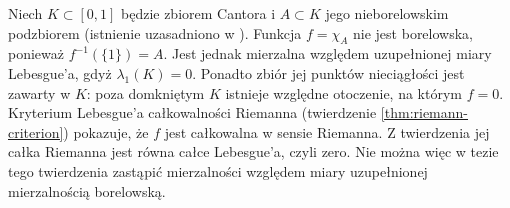\begin{przyklad}
\label{it:ex:riemann-nonborel}
Niech $K\subset[0,1]$ będzie zbiorem Cantora i
$A\subset K$ jego nieborelowskim podzbiorem
(istnienie uzasadniono w
).
Funkcja $f=\chi_A$ nie jest borelowska, ponieważ
$f^{-1}(\{1\})=A$. Jest jednak mierzalna względem
uzupełnionej miary Lebesgue'a, gdyż
$\lambda_1(K)=0$. Ponadto zbiór jej punktów
nieciągłości jest zawarty w $K$: poza domkniętym
$K$ istnieje względne otoczenie, na którym $f=0$.
Kryterium Lebesgue'a całkowalności Riemanna
(twierdzenie \ref{thm:riemann-criterion})
pokazuje, że $f$ jest całkowalna w sensie Riemanna.
Z twierdzenia  jej całka
Riemanna jest równa całce Lebesgue'a, czyli zero.
Nie można więc w tezie tego twierdzenia
zastąpić mierzalności względem miary uzupełnionej
mierzalnością borelowską.
\end{przyklad}
